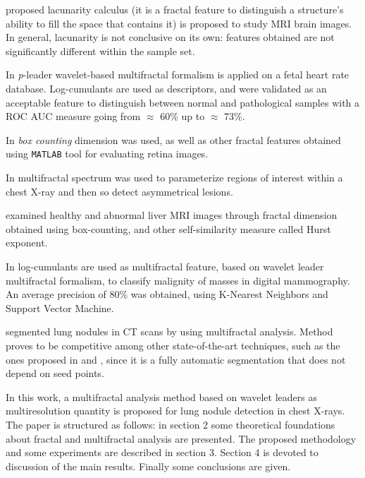 \documentclass{article}
\begin{document}
\citep{maceda2014computo} proposed lacunarity calculus (it is a fractal feature to distinguish a structure's ability to fill the space that contains it) is proposed to study MRI brain images. In general, lacunarity is not conclusive on its own: features obtained are not significantly different within the sample set. 

In \citep{leonarduzzi2014analisis} \textit{p}-leader wavelet-based multifractal formalism is applied on a fetal heart rate database. Log-cumulants are used as descriptors, and were validated as an acceptable feature to distinguish between normal and pathological samples with a ROC AUC measure going from $\approx$ 60\% up to $\approx$ 73\%. 

In \citep{hernandez2015analisis} \textit{box counting} dimension was used, as well as other fractal features obtained using \lstinline|MATLAB| tool for evaluating retina images. 

In \citep{troshin2015multifractal} multifractal spectrum was used to parameterize regions of interest within a chest X-ray and then so detect asymmetrical lesions. 

\citep{marusina2017mri} examined healthy and abnormal liver MRI images through fractal dimension obtained using box-counting, and other self-similarity measure called Hurst exponent.

In \citep{lorenaleon} log-cumulants are used as multifractal feature, based on wavelet leader multifractal formalism, to classify malignity of masses in digital mammography. An average precision of 80\% was obtained, using K-Nearest Neighbors and Support Vector Machine.

\citep{lee2020automatic} segmented lung nodules in CT scans by using multifractal analysis. Method proves to be competitive among other state-of-the-art techniques, such as the ones proposed in \citep{xu2002automated} and \citep{kostis2003three}, since it is a fully automatic segmentation that does not depend on seed points.

In this work, a multifractal analysis method based on wavelet leaders as multiresolution quantity is proposed for lung nodule detection in chest X-rays. The paper is structured as follows: in section 2 some theoretical foundations about fractal and multifractal analysis are presented. The proposed methodology and some experiments are described in section 3. Section 4 is devoted to discussion of the main results. Finally some conclusions are given. 
\end{document}
